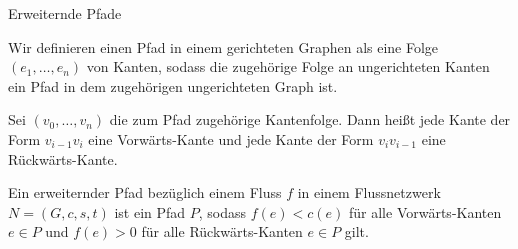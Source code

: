 \documentclass[aspectratio=169]{beamer}
\begin{document}
  \begin{frame}{Erweiternde Pfade}

  \begin{definition*}[Pfad]
    Wir definieren einen Pfad in einem gerichteten Graphen als eine Folge
    $(e_1,\dots,e_n)$ von Kanten, sodass die zugehörige Folge an ungerichteten
    Kanten ein Pfad in dem zugehörigen ungerichteten Graph ist.
    \pause


    Sei $(v_0,\dots,v_n)$ die zum Pfad zugehörige Kantenfolge.
    Dann heißt jede Kante der Form $v_{i-1}v_{i}$ eine Vorwärts-Kante
    und jede Kante der Form $v_{i}v_{i-1}$ eine Rückwärts-Kante.

  \end{definition*}

  \pause

  \begin{definition*}
    Ein erweiternder Pfad bezüglich einem Fluss $f$ in einem Flussnetzwerk
    $N = (G,c,s,t)$ ist ein Pfad $P$,
    sodass $f(e) < c(e)$ für alle Vorwärts-Kanten $e \in P$ und $f(e) > 0$
    für alle Rückwärts-Kanten $e \in P$ gilt.
  \end{definition*}

  \end{frame}
\end{document}
